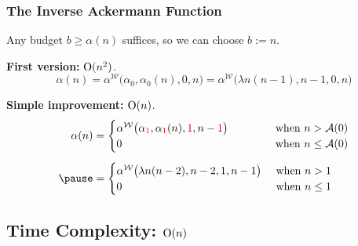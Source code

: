 \begin{frame}
\frametitle{The Inverse Ackermann Function}

\pause
Any budget $b \ge \alpha(n)$ suffices, so we can choose $b := n$.

\bigskip

\pause
\textbf{First version:} $\text{O}(n^2)$.
\pause
\begin{equation*}
\alpha(n) = \alpha^{\mathcal{W}}\big(\alpha_0, \alpha_0(n), 0, n\big)
= \alpha^{\mathcal{W}}\big(\lambda n(n - 1), n - 1, 0, n\big)
\end{equation*}

\smallskip

\pause
\textbf{Simple improvement:} $\text{O}(n)$.
\pause
\begin{equation*}
\begin{aligned}
\alpha(n) & = \begin{cases}
\alpha^{\mathcal{W}}\big(\alpha_{{\color{red} 1}}, \alpha_{{\color{red} 1}}(n), {{\color{red} 1}}, n - {{\color{red} 1}}\big) & \hspace{3em}\text{ when } n > \Ack(0) \\
0 & \hspace{3em}\text{ when } n \le \Ack(0)
\end{cases} \\[5pt]
\pause & = \begin{cases}
\alpha^{\mathcal{W}}\big(\lambda n(n - 2), n - 2, 1, n - 1\big) & \text{ when } n > 1 \\
0 & \text{ when } n \le 1
\end{cases}
\end{aligned}
\end{equation*}

\end{frame}


\subsection{Time Complexity: $\text{O}(n)$}

